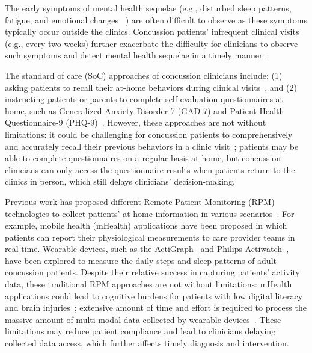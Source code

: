 The early symptoms of mental health sequelae (e.g., disturbed sleep patterns, fatigue, and emotional changes ~\cite{brent2017psychiatric, silverberg2023management}) are often difficult to observe as these symptoms typically occur outside the clinics.
Concussion patients' infrequent clinical visits (e.g., every two weeks) further exacerbate the difficulty for clinicians to observe such symptoms and detect mental health sequelae in a timely manner~\cite{silverberg2023management,rose2015diagnosis,mcleod2017rest}.





The standard of care (SoC) approaches of concussion clinicians include: (1) asking patients to recall their at-home behaviors during clinical visits~\cite{silverberg2020management,brent2017psychiatric}, and (2) instructing patients or parents to complete self-evaluation questionnaires at home, such as Generalized Anxiety Disorder-7 (GAD-7) and Patient Health Questionnaire-9 (PHQ-9)~\cite{carson2021using, silverberg2020management}.
However, these approaches are not without limitations:
it could be challenging for concussion patients to comprehensively and accurately recall their previous behaviors in a clinic visit~\cite{frissa2016challenges,van2016accuracy}; 
patients may be able to complete questionnaires on a regular basis at home, but concussion clinicians can only access the questionnaire results when patients return to the clinics in person, which still delays clinicians' decision-making.




Previous work has proposed different Remote Patient Monitoring (RPM) technologies to collect patients' at-home information in various scenarios~\cite{chung2016boundary,olen2017implantable,barnes2024clinician,van2023clinician,toresdahl2021systematic,tirosh2024smartphone}.
For example, mobile health (mHealth) applications have been proposed in which patients can report their physiological measurements to care provider teams in real time. 
Wearable devices, such as the ActiGraph~\cite{yang2020bidirectional} and Philips Actiwatch~\cite{donahue2024feasibility}, have been explored to measure the daily steps and sleep patterns of adult concussion patients.
Despite their relative success in capturing patients' activity data, these traditional RPM approaches are not without limitations: mHealth applications could lead to cognitive burdens for patients with low digital literacy and brain injuries~\cite{giebel2024problems,purdy2023exploring}; extensive amount of time and effort is required to process the massive amount of multi-modal data collected by wearable devices~\cite{ginsburg2024key,baig2017systematic}.
These limitations may reduce patient compliance and lead to clinicians delaying collected data access,  which further affects timely diagnosis and intervention.






